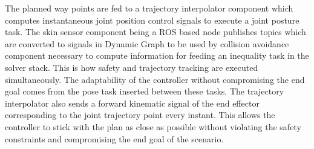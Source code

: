 The planned way points are fed to a trajectory
interpolator component which computes instantaneous joint position control
signals to execute a joint posture task. The skin sensor component being a
ROS based node publishes topics which are converted to signals in Dynamic
Graph to be used by collision avoidance component necessary to compute
information for feeding an inequality task in the solver stack. This is how
safety and trajectory tracking are executed simultaneously. The adaptability of the controller without compromising the end goal comes
from the pose task inserted between these tasks. The trajectory interpolator also sends a forward kinematic signal of the end effector corresponding to the joint trajectory point every instant. This allows the controller to stick with the
plan as close as possible without violating the safety constraints and
compromising the end goal of the scenario.



